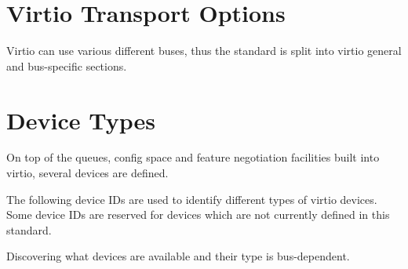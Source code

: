 \chapter{Virtio Transport Options}\label{sec:Virtio Transport Options}

Virtio can use various different buses, thus the standard is split
into virtio general and bus-specific sections.





\chapter{Device Types}\label{sec:Device Types}

On top of the queues, config space and feature negotiation facilities
built into virtio, several devices are defined.

The following device IDs are used to identify different types of virtio
devices.  Some device IDs are reserved for devices which are not currently
defined in this standard.

Discovering what devices are available and their type is bus-dependent.

